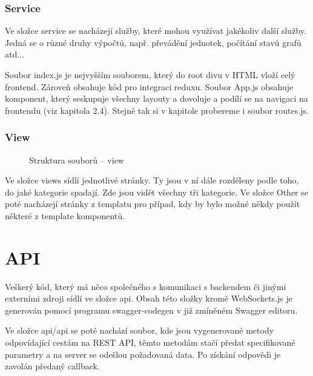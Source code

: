 \documentclass[a4paper,oneside,12pt]{report}
\begin{document}
\subsubsection{Service}


Ve složce service se nacházejí služby, které mohou využívat jakékoliv další služby.
Jedná se o různé druhy výpočtů, např. převádění jednotek, počítání stavů grafů atd...

Soubor index.js je nejvyšším souborem, který do root divu v HTML vloží celý frontend.
Zároveň obsahuje kód pro integraci reduxu.
Soubor App.js obsahuje komponent, který seskupuje všechny layouty a dovoluje a podílí se na navigaci na frontendu (viz kapitola 2.4).
Stejně tak si v kapitole probereme i soubor routes.js.

\newpage
\subsubsection{View}

\begin{figure}[h]
	\caption[Struktura souborů -- view, vlastní tvorba]{Struktura souborů -- view}
	\label{fig:frontendStructureView}
\end{figure}

Ve složce views sídlí jednotlivé stránky.
Ty jsou v ní dále rozděleny podle toho, do jaké kategorie spadají.
Zde jsou vidět všechny tři kategorie.
Ve složce Other se poté nacházejí stránky z templatu pro případ, kdy by bylo možné někdy použít některé z template komponentů.

\newpage
\section{API}

Veškerý kód, který má něco společného s komunikaci s backendem či jinými externími zdroji sídlí ve složce api.
Obsah této složky kromě WebSockets.js je generován pomocí programu swagger-codegen v již zmíněném Swagger editoru.

Ve složce api/api se poté nachází soubor, kde jsou vygenerované metody odpovídající cestám na REST API, těmto metodám stačí předat specifikované parametry a na server se odešlou požadovaná data.
Po získání odpovědi je zavolán předaný callback.
\end{document}
